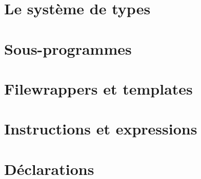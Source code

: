 \documentclass [a4paper, 10pt, openany] {book}
\begin{document}
\part{Le système de types}
  
  
  
  
  
  
  
  
  
  
  
  
  
  
  
  
  
  
  
  
  
  
  
  
  
  
  

\part{Sous-programmes}





\part{Filewrappers et templates}



\part{Instructions et expressions}










\part{Déclarations}
\end{document}
